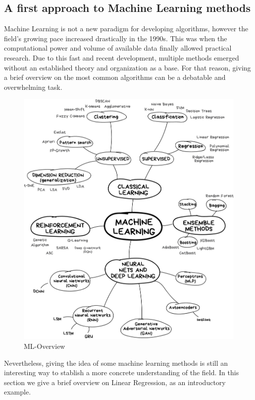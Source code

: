 
\subsection{A first approach to Machine Learning methods}

Machine Learning is not a new paradigm for developing algorithms, however the field's growing pace increased drastically in the 1990s. This was when the computational power and volume of available data finally allowed practical research. Due to this fast and recent development, multiple methods emerged without an established theory and organization as a base. For that reason, giving a brief overview on the most common algorithms can be a debatable and overwhelming task. 

\begin{figure}[hbtp]
	\centering
	\includegraphics[width=1\textwidth]{ML}
	\caption{ML-Overview}
	\label{fig:Datensatz - unbearbeitet}
\end{figure}

Nevertheless, giving the idea of some machine learning methods is still an interesting way to stablish a more concrete understanding of the field. In this section we give a brief overview on Linear Regression, as an introductory example. 


